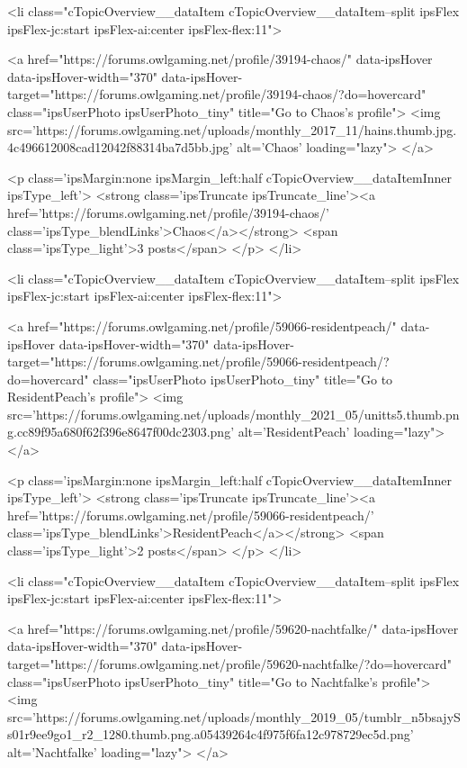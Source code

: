 						<li class="cTopicOverview__dataItem cTopicOverview__dataItem--split ipsFlex ipsFlex-jc:start ipsFlex-ai:center ipsFlex-flex:11">
							


	<a href="https://forums.owlgaming.net/profile/39194-chaos/" data-ipsHover data-ipsHover-width="370" data-ipsHover-target="https://forums.owlgaming.net/profile/39194-chaos/?do=hovercard" class="ipsUserPhoto ipsUserPhoto_tiny" title="Go to Chaos's profile">
		<img src='https://forums.owlgaming.net/uploads/monthly_2017_11/hains.thumb.jpg.4c496612008cad12042f88314ba7d5bb.jpg' alt='Chaos' loading="lazy">
	</a>

							<p class='ipsMargin:none ipsMargin_left:half cTopicOverview__dataItemInner ipsType_left'>
								<strong class='ipsTruncate ipsTruncate_line'><a href='https://forums.owlgaming.net/profile/39194-chaos/' class='ipsType_blendLinks'>Chaos</a></strong>
								<span class='ipsType_light'>3 posts</span>
							</p>
						</li>
					
						<li class="cTopicOverview__dataItem cTopicOverview__dataItem--split ipsFlex ipsFlex-jc:start ipsFlex-ai:center ipsFlex-flex:11">
							


	<a href="https://forums.owlgaming.net/profile/59066-residentpeach/" data-ipsHover data-ipsHover-width="370" data-ipsHover-target="https://forums.owlgaming.net/profile/59066-residentpeach/?do=hovercard" class="ipsUserPhoto ipsUserPhoto_tiny" title="Go to ResidentPeach's profile">
		<img src='https://forums.owlgaming.net/uploads/monthly_2021_05/unitts5.thumb.png.cc89f95a680f62f396e8647f00dc2303.png' alt='ResidentPeach' loading="lazy">
	</a>

							<p class='ipsMargin:none ipsMargin_left:half cTopicOverview__dataItemInner ipsType_left'>
								<strong class='ipsTruncate ipsTruncate_line'><a href='https://forums.owlgaming.net/profile/59066-residentpeach/' class='ipsType_blendLinks'>ResidentPeach</a></strong>
								<span class='ipsType_light'>2 posts</span>
							</p>
						</li>
					
						<li class="cTopicOverview__dataItem cTopicOverview__dataItem--split ipsFlex ipsFlex-jc:start ipsFlex-ai:center ipsFlex-flex:11">
							


	<a href="https://forums.owlgaming.net/profile/59620-nachtfalke/" data-ipsHover data-ipsHover-width="370" data-ipsHover-target="https://forums.owlgaming.net/profile/59620-nachtfalke/?do=hovercard" class="ipsUserPhoto ipsUserPhoto_tiny" title="Go to Nachtfalke's profile">
		<img src='https://forums.owlgaming.net/uploads/monthly_2019_05/tumblr_n5bsajySs01r9ee9go1_r2_1280.thumb.png.a05439264c4f975f6fa12c978729ec5d.png' alt='Nachtfalke' loading="lazy">
	</a>

